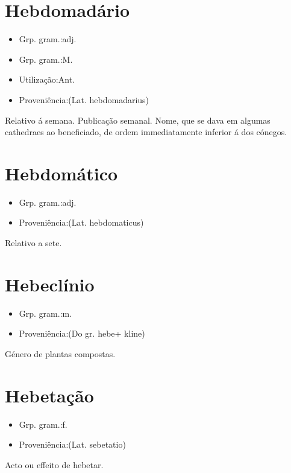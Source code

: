 \documentclass{article}
\begin{document}
\section{Hebdomadário}
\begin{itemize}
\item {Grp. gram.:adj.}
\end{itemize}
\begin{itemize}
\item {Grp. gram.:M.}
\end{itemize}
\begin{itemize}
\item {Utilização:Ant.}
\end{itemize}
\begin{itemize}
\item {Proveniência:(Lat. \textunderscore hebdomadarius\textunderscore )}
\end{itemize}
Relativo á semana.
Publicação semanal.
Nome, que se dava em algumas cathedraes ao beneficiado, de ordem immediatamente inferior á dos cónegos.
\section{Hebdomático}
\begin{itemize}
\item {Grp. gram.:adj.}
\end{itemize}
\begin{itemize}
\item {Proveniência:(Lat. \textunderscore hebdomaticus\textunderscore )}
\end{itemize}
Relativo a sete.
\section{Hebeclínio}
\begin{itemize}
\item {Grp. gram.:m.}
\end{itemize}
\begin{itemize}
\item {Proveniência:(Do gr. \textunderscore hebe\textunderscore  + \textunderscore kline\textunderscore )}
\end{itemize}
Género de plantas compostas.
\section{Hebetação}
\begin{itemize}
\item {Grp. gram.:f.}
\end{itemize}
\begin{itemize}
\item {Proveniência:(Lat. \textunderscore sebetatio\textunderscore )}
\end{itemize}
Acto ou effeito de hebetar.
\end{document}
